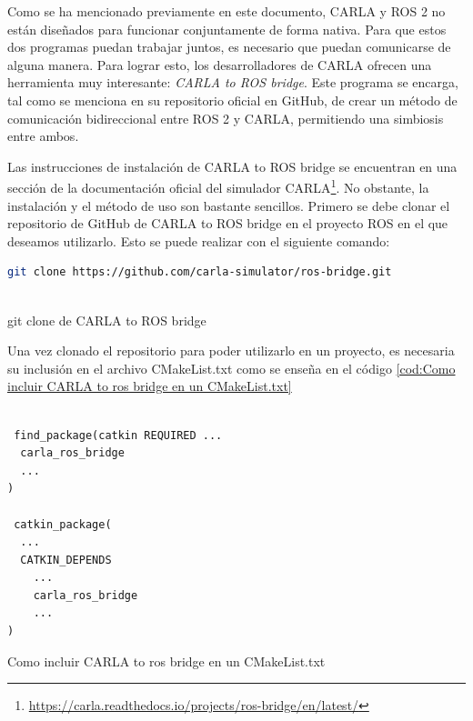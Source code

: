 Como se ha mencionado previamente en este documento, CARLA y ROS 2 no están diseñados para funcionar conjuntamente de forma nativa. Para que estos dos programas puedan trabajar juntos, es necesario que puedan comunicarse de alguna manera. Para lograr esto, los desarrolladores de CARLA ofrecen una herramienta muy interesante: \textit{CARLA to ROS bridge}. Este programa se encarga, tal como se menciona en su repositorio oficial en GitHub\cite{carla_to_ros_bridge}, de crear un método de comunicación bidireccional entre ROS 2 y CARLA, permitiendo una simbiosis entre ambos.

\bigskip

Las instrucciones de instalación de CARLA to ROS bridge se encuentran en una sección de la documentación oficial del simulador CARLA\footnote{\url{https://carla.readthedocs.io/projects/ros-bridge/en/latest/}}. No obstante, la instalación y el método de uso son bastante sencillos. Primero se debe clonar el repositorio de GitHub de CARLA to ROS bridge en el proyecto ROS en el que deseamos utilizarlo. Esto se puede realizar con el siguiente comando:

  \begin{code}[H]
	\begin{lstlisting}[language=sh]
	git clone https://github.com/carla-simulator/ros-bridge.git 
 
	\end{lstlisting}
\caption[git clone de CARLA to ROS bridgel ]{git clone de CARLA to ROS bridge}
\label{cod:git clone de carla to ros bridge}
\end{code}

 Una vez clonado el repositorio para poder utilizarlo en un proyecto, es necesaria su inclusión en el archivo CMakeList.txt como se enseña en el código \ref{cod:Como incluir CARLA to ros bridge en un CMakeList.txt}

 
 \begin{code}[H]
	\begin{lstlisting}[language=Python]
	
 find_package(catkin REQUIRED ...
  carla_ros_bridge  
  ...
)
 
 catkin_package(
  ...
  CATKIN_DEPENDS
    ...
    carla_ros_bridge
    ...
)
	\end{lstlisting}
\caption[Como incluir CARLA to ros bridge en un CMakeList.txt ]{Como incluir CARLA to ros bridge en un CMakeList.txt}
\label{cod:Como incluir CARLA to ros bridge en un CMakeList.txt}
\end{code}
 
